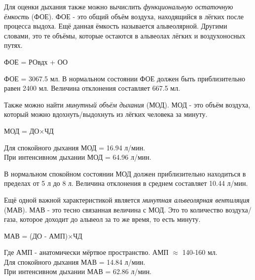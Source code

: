 \documentclass{article}
\begin{document}
        Для оценки дыхания также можно вычислить \textit{функциональную остаточную ёмкость} (ФОЕ).
        ФОЕ - это общий объём воздуха, находящийся в лёгких после процесса выдоха. Ещё данная ёмкость
        называется альвеолярной. Другими словами, это те объёмы, которые остаются в альвеолах лёгких и воздухоносных
        путях.

        \begin{center}
            ФОЕ = РО{вдх} + ОО
        \end{center}

        ФОЕ = 3067.5 мл. В нормальном состоянии ФОЕ должен быть приблизительно
        равен 2400 мл. Величина отклонения составляет 667.5 мл.
        \vspace*{4mm}

        Также можно найти \textit{минутный объём дыхания} (МОД).
        МОД - это объём воздуха, который можно вдохнуть/выдохнуть из
        лёгких человека за минуту.

        \begin{center}
            МОД = ДО$\times$ЧД
        \end{center}
        Для спокойного дыхания МОД = 16.94 л/мин.\\
        При интенсивном дыхании МОД = 64.96 л/мин.
        \vspace*{4mm}

        \hspace*{4mm} В нормальном спокойном состоянии МОД должен приблизительно находиться
        в пределах от 5 л до 8 л. Величина отклонения в среднем составляет 10.44 л/мин.
        \vspace*{4mm}
        
        Ещё одной важной характеристикой является \textit{минутная альвеолярная вентиляция} (МАВ).
        МАВ - это тесно связанная величина с МОД. Это то количество воздуха/газа, которое
        доходит до альвеол за то же время, то есть минуту.

        \begin{center}
            МАВ = (ДО - АМП)$\times$ЧД
        \end{center}

        Где АМП - анатомически мёртвое пространство. АМП $\approx$ 140-160 мл.
        \vspace*{4mm}
        \\
        Для спокойного дыхания МАВ = 14.84 л/мин. \\
        При интенсивном дыхании МАВ = 62.86 л/мин.
        \vspace*{4mm}
\end{document}
